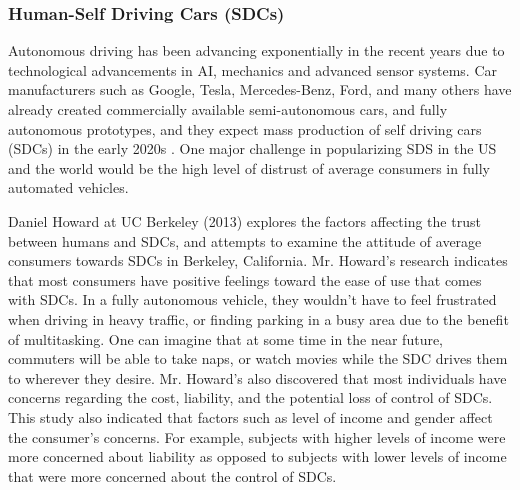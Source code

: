 \documentclass[runningheads,a4paper]{llncs}
\begin{document}
\subsubsection{Human-Self Driving Cars (SDCs)}
Autonomous driving has been advancing exponentially in the recent years due to technological advancements in AI, mechanics and advanced sensor systems. Car manufacturers such as Google, Tesla, Mercedes-Benz, Ford, and many others have already created commercially available semi-autonomous cars, and fully autonomous prototypes, and they expect mass production of self driving cars (SDCs) in the early 2020s \cite{driverlessFutureForcast}. One major challenge in popularizing SDS in the US and the world would be the high level of distrust of average consumers in fully automated vehicles.

Daniel Howard at UC Berkeley (2013) \cite{howard2014public} explores the factors affecting the trust between humans and SDCs, and attempts to examine the attitude of average consumers towards SDCs in Berkeley, California. Mr. Howard's research indicates that most consumers have positive feelings toward the ease of use that comes with SDCs. In a fully autonomous vehicle, they wouldn't have to feel frustrated when driving in heavy traffic, or finding parking in a busy area due to the benefit of multitasking. One can imagine that at some time in the near future, commuters will be able to take naps, or watch movies while the SDC drives them to wherever they desire. Mr. Howard's also discovered that most individuals have concerns regarding the cost, liability, and the potential loss of control of SDCs. This study also indicated that factors such as level of income and gender affect the consumer's concerns. For example, subjects with higher levels of income were more concerned about liability as opposed to subjects with lower levels of income that were more concerned about the control of SDCs.
\end{document}
